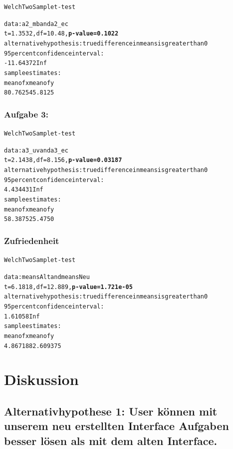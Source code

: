 \documentclass[a4paper,10pt]{scrartcl}
\begin{document}
\begin{alltt}
Welch Two Sample t-test

data:  a2_mb and a2_ec 
t = 1.3532, df = 10.48, \textbf{p-value = 0.1022}
alternative hypothesis: true difference in means is greater than 0 
95 percent confidence interval:
 -11.64372       Inf 
sample estimates:
mean of x mean of y 
  80.7625   45.8125 
\end{alltt} 

\subsubsection*{Aufgabe 3:}

\begin{alltt}
Welch Two Sample t-test

data:  a3_uv and a3_ec 
t = 2.1438, df = 8.156, \textbf{p-value = 0.03187}
alternative hypothesis: true difference in means is greater than 0 
95 percent confidence interval:
 4.434431      Inf 
sample estimates:
mean of x mean of y 
  58.3875   25.4750 
\end{alltt} 

\subsubsection*{Zufriedenheit} 

\begin{alltt}
Welch Two Sample t-test

data:  meansAlt and meansNeu 
t = 6.1818, df = 12.889, \textbf{p-value = 1.721e-05}
alternative hypothesis: true difference in means is greater than 0 
95 percent confidence interval:
 1.61058     Inf 
sample estimates:
mean of x mean of y 
 4.867188  2.609375 
\end{alltt} 

\section{Diskussion}

\subsection{Alternativhypothese 1:  User können mit unserem neu erstellten Interface Aufgaben besser lösen als mit dem alten Interface.} 
\end{document}
